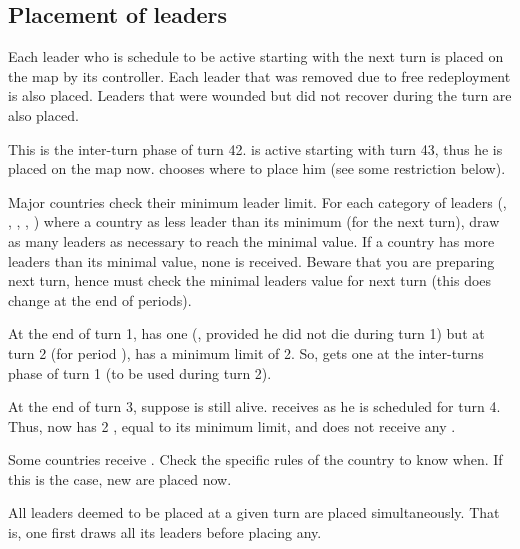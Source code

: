 \subsection{Placement of leaders}
Each leader who is schedule to be active starting with the next turn is placed
on the map by its controller.
\bparag Each leader that was removed due to free redeployment is also placed.
\bparag Leaders that were wounded but did not recover during the turn are also
placed.

\begin{exemple}
  This is the inter-turn phase of turn 42.  is
  active starting with turn 43, thus he is placed on the map now. \ANG chooses
  where to place him (see some restriction below).
\end{exemple}

\aparag[Anonymous] Major countries check their minimum leader limit.
\bparag For each category of leaders (\LeaderG, \LeaderA, \LeaderE, \LeaderC,
\LeaderGov) where a country as less leader than its minimum (for the next
turn), draw as many leaders as necessary to reach the minimal value.
\bparag If a country has more leaders than its minimal value, none is
received.
\bparag Beware that you are preparing next turn, hence must check the minimal
leaders value for next turn (this does change at the end of periods).

\begin{exemple}
  At the end of turn 1, \RUS has one \LeaderG (,
  provided he did not die during turn 1) but at turn 2 (for period
  ), \RUS has a minimum limit of 2\LeaderG. So, \RUS gets one
  \anonyme\LeaderG at the inter-turns phase of turn 1 (to be used during turn
  2).

  \smallskip

  At the end of turn 3, suppose \leaderShchenya is still alive. \RUS receives
   as he is scheduled for turn 4. Thus, \RUS now
  has 2 \LeaderG, equal to its minimum limit, and does not receive any
  \anonyme\LeaderG.
\end{exemple}

\aparag[Missionaries] Some countries receive \LeaderMis. Check the specific
rules of the country to know when.
\bparag If this is the case, new \LeaderMis are placed now.

\aparag[Placement] All leaders deemed to be placed at a given turn are placed
simultaneously. That is, one first draws all its \anonyme leaders before
placing any.

